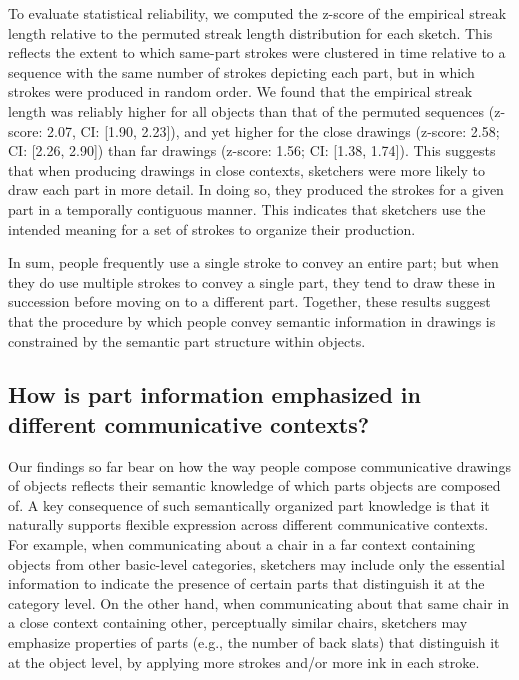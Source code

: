 \documentclass[10pt,letterpaper]{article}
\begin{document}
To evaluate statistical reliability, we computed the z-score of the empirical streak length relative to the permuted streak length distribution for each sketch. 
This reflects the extent to which same-part strokes were clustered in time relative to a sequence with the same number of strokes depicting each part, but in which strokes were produced in random order. 
We found that the empirical streak length was reliably higher for all objects than that of the permuted sequences (z-score: 2.07, CI: [1.90, 2.23]), and yet higher for the close drawings (z-score: 2.58; CI: [2.26, 2.90]) than far drawings (z-score: 1.56; CI: [1.38, 1.74]).
This suggests that when producing drawings in close contexts, sketchers were more likely to draw each part in more detail. In doing so, they produced the strokes for a given part in a temporally contiguous manner. This indicates that sketchers use the intended meaning for a set of strokes to organize their production.

In sum, people frequently use a single stroke to convey an entire part; but when they do use multiple strokes to convey a single part, they tend to draw these in succession before moving on to a different part.
Together, these results suggest that the procedure by which people convey semantic information in drawings is constrained by the semantic part structure within objects.

\subsection{How is part information emphasized in different communicative contexts?}

Our findings so far bear on how the way people compose communicative drawings of objects reflects their semantic knowledge of which parts objects are composed of. 
A key consequence of such semantically organized part knowledge is that it naturally supports flexible expression across different communicative contexts. 
For example, when communicating about a chair in a far context containing objects from other basic-level categories, sketchers may include only the essential information to indicate the presence of certain parts that distinguish it at the category level. 
On the other hand, when communicating about that same chair in a close context containing other, perceptually similar chairs, sketchers may emphasize properties of parts (e.g., the number of back slats) that distinguish it at the object level, by applying more strokes and/or more ink in each stroke.
\end{document}
